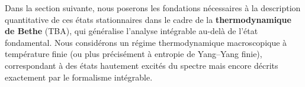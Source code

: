 \medskip

Dans la section suivante, nous poserons les fondations nécessaires à la description quantitative de ces états stationnaires dans le cadre de la \textbf{thermodynamique de Bethe} (TBA), qui généralise l’analyse intégrable au-delà de l’état fondamental.  
Nous considérons un régime thermodynamique macroscopique à température finie (ou plus précisément à entropie de Yang–Yang finie), correspondant à des états hautement excités du spectre mais encore décrits exactement par le formalisme intégrable.




